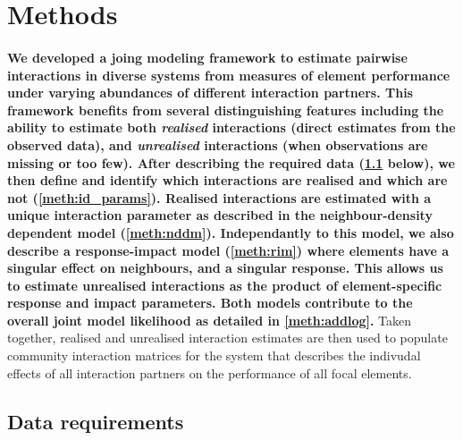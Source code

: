 \documentclass[a4,12pt]{article}
\begin{document}

\section{Methods}

\paragraph{} 
\textbf{
We developed a joing modeling framework to estimate pairwise interactions in diverse systems from measures of element performance under varying abundances of different interaction partners. This framework benefits from several distinguishing features including the ability to estimate both \textit{realised} interactions (direct estimates from the observed data), and \textit{unrealised} interactions (when observations are missing or too few). After describing the required data (\ref{meth:data} below), we then define and identify which interactions are realised and which are not (\ref{meth:id_params}). Realised interactions are estimated with a unique interaction parameter as described in the neighbour-density dependent model (\ref{meth:nddm}). Independantly to this model, we also describe a response-impact model (\ref{meth:rim}) where elements have a singular effect on neighbours, and a singular response. This allows us to estimate unrealised interactions as the product of element-specific response and impact parameters. Both models contribute to the overall joint model likelihood as detailed in \ref{meth:addlog}.}
Taken together, realised and unrealised interaction estimates are then used to populate community interaction matrices for the system that describes the indivudal effects of all interaction partners on the performance of all focal elements. 




    \subsection{Data requirements}
    \label{meth:data}
\end{document}
